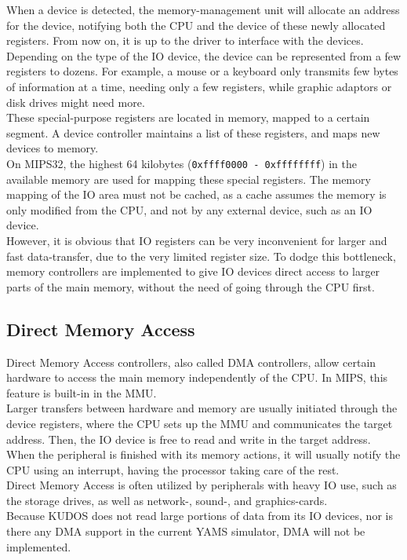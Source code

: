 When a device is detected, the memory-management unit will allocate an address
for the device, notifying both the CPU and the device of these newly allocated registers.
From now on, it is up to the driver to interface with the devices.\\
Depending on the type of the IO device, the device can be represented from a
few registers to dozens. For example, a mouse or a keyboard only transmits few
bytes of information at a time, needing only a few registers, while graphic
adaptors or disk drives might need more\cite{cs_uwm:memory_mapped_io}.\\
These special-purpose registers are located in memory, mapped to a certain
segment. A device controller maintains a list of these registers, and maps new
devices to memory.\cite{britton:mips}\\
On MIPS32, the highest 64 kilobytes (\texttt{0xffff0000 - 0xffffffff}) in the
available memory are used for mapping these special registers\cite{cs_uwm:memory_mapped_io}.
The memory mapping of the IO area must not be cached, as a cache assumes the
memory is only modified from the CPU, and not by any external device, such as
an IO device.\\
However, it is obvious that IO registers can be very inconvenient for larger and
fast data-transfer, due to the very limited register size. To dodge this
bottleneck, memory controllers are implemented to give IO devices direct access
to larger parts of the main memory, without the need of going through the CPU first.

\subsection{Direct Memory Access}
Direct Memory Access controllers, also called DMA controllers, allow certain
hardware to access the main memory independently of the CPU.
In MIPS, this feature is built-in in the MMU.\\
Larger transfers between hardware and memory are usually initiated through
the device registers, where the CPU sets up the MMU and communicates the target
address. Then, the IO device is free to read and write in the target address.
When the peripheral is finished with its memory actions, it will usually
notify the CPU using an interrupt, having the processor taking care of the rest.\\
Direct Memory Access is often utilized by peripherals with heavy IO use, such
as the storage drives, as well as network-, sound-, and graphics-cards.\\
Because KUDOS does not read large portions of data from its IO devices, nor is
there any DMA support in the current YAMS simulator, DMA will not be implemented.

